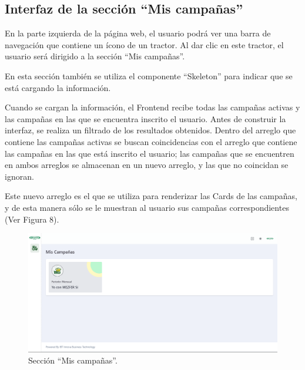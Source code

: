 \subsection{Interfaz de la sección ``Mis campañas''}
En la parte izquierda de la página web, el usuario podrá ver una barra de navegación que contiene un ícono de un tractor. Al dar clic en este tractor, el usuario será dirigido a la sección ``Mis campañas''.

En esta sección también se utiliza el componente ``Skeleton'' para indicar que se está cargando la información.

Cuando se cargan la información, el Frontend recibe todas las campañas activas y las campañas en las que se encuentra inscrito el usuario. Antes de construir la interfaz, se realiza un filtrado de los resultados obtenidos. Dentro del arreglo que contiene las campañas activas se buscan coincidencias con el arreglo que contiene las campañas en las que está inscrito el usuario; las campañas que se encuentren en ambos arreglos se almacenan en un nuevo arreglo, y las que no coincidan se ignoran.

Este nuevo arreglo es el que se utiliza para renderizar las Cards de las campañas, y de esta manera sólo se le muestran al usuario sus campañas correspondientes (Ver Figura 8).

    \begin{figure}[H]
        \begin{center}
            \includegraphics[scale=0.35]{img/actividades/campanias/mis-campanias.png}
            \caption{Sección ``Mis campañas''.}
            \label{fig:seccion-campañas}
        \end{center}
    \end{figure}